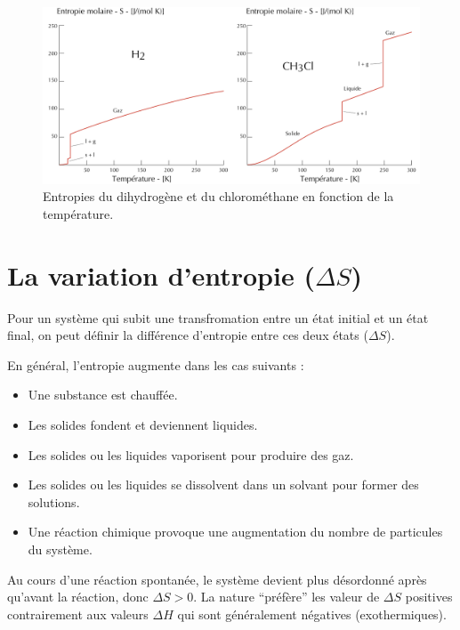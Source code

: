 \documentclass[
  11pt,
  french,
  a4paper,
  openany]{book}
\providecommand{\tightlist}{%
  \setlength{\itemsep}{0pt}\setlength{\parskip}{0pt}}
\begin{document}
\begin{figure}

{\centering \includegraphics[width=0.9\linewidth]{images/entropie-graph} 

}

\caption{Entropies du dihydrogène et du chlorométhane en fonction de la température.}\label{fig:entropie-graph}
\end{figure}

\hypertarget{la-variation-dentropie-delta-s}{%
\section{\texorpdfstring{La variation d'entropie (\(\Delta S\))}{La variation d'entropie (\textbackslash Delta S)}}\label{la-variation-dentropie-delta-s}}

Pour un système qui subit une transfromation entre un état initial et un état final, on peut définir la différence d'entropie entre ces deux états (\(\Delta S\)).

En général, l'entropie augmente dans les cas suivants :

\begin{itemize}
\tightlist
\item
  Une substance est chauffée.
\item
  Les solides fondent et deviennent liquides.
\item
  Les solides ou les liquides vaporisent pour produire des gaz.
\item
  Les solides ou les liquides se dissolvent dans un solvant pour former des solutions.
\item
  Une réaction chimique provoque une augmentation du nombre de particules du système.
\end{itemize}

Au cours d'une réaction spontanée, le système devient plus désordonné après qu'avant la réaction, donc \(\Delta S > 0\). La nature ``préfère'' les valeur de \(\Delta S\) positives contrairement aux valeurs \(\Delta H\) qui sont généralement négatives (exothermiques).
\end{document}
